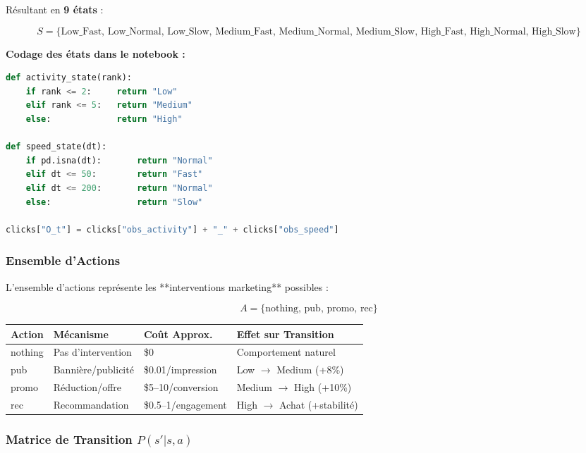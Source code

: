 \documentclass[11pt,a4paper]{article}
\renewcommand{\arraystretch}{1.35}
\begin{document}
Résultant en \textbf{9 états} :
 
\[
  S = \{\text{Low\_Fast, Low\_Normal, Low\_Slow,}
  \text{ Medium\_Fast, Medium\_Normal, Medium\_Slow,}
  \text{ High\_Fast, High\_Normal, High\_Slow}\}
\]
 
\begin{resultBox}
\textbf{Codage des états dans le notebook :}
\begin{lstlisting}[language=Python]
def activity_state(rank):
    if rank <= 2:     return "Low"
    elif rank <= 5:   return "Medium"
    else:             return "High"
 
def speed_state(dt):
    if pd.isna(dt):       return "Normal"
    elif dt <= 50:        return "Fast"
    elif dt <= 200:       return "Normal"
    else:                 return "Slow"
 
clicks["O_t"] = clicks["obs_activity"] + "_" + clicks["obs_speed"]
\end{lstlisting}
\end{resultBox}
\newpage
\subsubsection{Ensemble d'Actions}
 
L'ensemble d'actions représente les **interventions marketing** possibles :
 
\[
  A = \{\text{nothing, pub, promo, rec}\}
\]
 
\begin{center}
\renewcommand{\arraystretch}{1.4}
\begin{tabular}{l|lll}
\toprule
\textbf{Action} & \textbf{Mécanisme} & \textbf{Coût Approx.} & \textbf{Effet sur Transition} \\
\midrule
\rowcolor{LightGray}
nothing & Pas d'intervention & \$0 & Comportement naturel \\
\rowcolor{LightBlue}
pub & Bannière/publicité & \$0.01/impression & Low $\to$ Medium (+8\%) \\
\rowcolor{LightOrange}
promo & Réduction/offre & \$5--10/conversion & Medium $\to$ High (+10\%) \\
\rowcolor{LightGreen}
rec & Recommandation & \$0.5--1/engagement & High $\to$ Achat (+stabilité) \\
\bottomrule
\end{tabular}
\end{center}
 
\subsubsection{Matrice de Transition $P(s'|s,a)$}
 
\end{document}
